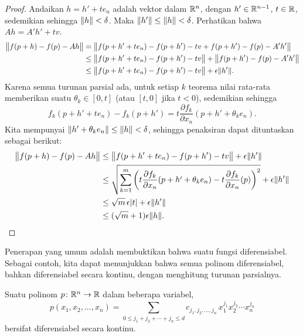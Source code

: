 \begin{proof}
Andaikan $h = h' + t e_n$ adalah vektor dalam ${\mathbb{R}}^n$, dengan $h' \in {\mathbb{R}}^{n-1}$,
$t \in {\mathbb{R}}$, sedemikian sehingga
$\lVert {h} \rVert < \delta$.  Maka $\lVert {h'} \rVert \leq \lVert {h} \rVert < \delta$.
Perhatikan bahwa $Ah = A' h' + tv$.
\begin{equation*}
\begin{split}
\bigl\lVert {f(p+h) - f(p) - Ah} \bigr\rVert
&
= \bigl\lVert {f(p+h' + t e_n) - f(p+h') - tv + f(p+h') - f(p) - A' h'} \bigr\rVert
\\
&
\leq \bigl\lVert {f(p+h' + t e_n) - f(p+h') -tv} \bigr\rVert + \bigl\lVert {f(p+h') - f(p) -
A' h'} \bigr\rVert
\\
&
\leq \bigl\lVert {f(p+h' + t e_n) - f(p+h') -tv} \bigr\rVert + \epsilon \lVert {h'} \rVert .
\end{split}
\end{equation*}
Karena semua turunan parsial ada, untuk setiap $k$ teorema nilai rata-rata memberikan
suatu $\theta_k \in [0,t]$ (atau $[t,0]$ jika $t < 0$), sedemikian sehingga
\begin{equation*}
f_k(p+h' + t e_n) - f_k(p+h') =
t \frac{\partial f_k}{\partial x_n}(p+h'+\theta_k e_n).
\end{equation*}
Kita mempunyai $\lVert {h'+\theta_k e_n} \rVert \leq \lVert {h} \rVert < \delta$,
sehingga penaksiran dapat dituntaskan sebagai berikut:
\begin{equation*}
\begin{split}
\bigl\lVert {f(p+h) - f(p) - Ah} \bigr\rVert
& \leq \bigl\lVert {f(p+h' + t e_n) - f(p+h') -tv} \bigr\rVert + \epsilon \lVert {h'} \rVert
\\
& \leq \sqrt{\sum_{k=1}^m {\left(t\frac{\partial f_k}{\partial x_n}(p+h'+\theta_k e_n) -
t \frac{\partial f_k}{\partial x_n}(p)\right)}^2} + \epsilon \lVert {h'} \rVert
\\
& \leq \sqrt{m}\, \epsilon \lvert {t} \rvert + \epsilon \lVert {h'} \rVert
\\
& \leq (\sqrt{m}+1)\epsilon \lVert {h} \rVert . \qedhere
\end{split}
\end{equation*}
\end{proof}

Penerapan yang umum adalah membuktikan bahwa suatu fungsi
diferensiabel.  Sebagai contoh, kita dapat menunjukkan bahwa semua polinom
diferensiabel, bahkan diferensiabel secara kontinu,
dengan menghitung turunan parsialnya.

\begin{cor}
Suatu polinom $p \colon {\mathbb{R}}^n \to {\mathbb{R}}$ dalam beberapa variabel,
\begin{equation*}
p(x_1,x_2,\ldots,x_n)
=
\sum_{0 \leq j_1+j_2+\cdots+j_n \leq d}
c_{j_1,j_2,\ldots,j_n}
\,
x_1^{j_1}
x_2^{j_2}
\cdots
x_n^{j_n}
\end{equation*}
bersifat diferensiabel secara kontinu.
\end{cor}

